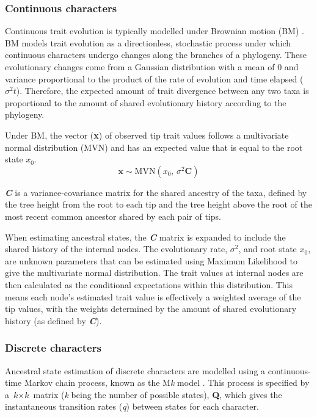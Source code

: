 \documentclass[titlepage]{article}
\begin{document}
\subsubsection{Continuous characters} \label{continuous ace}
Continuous trait evolution is typically modelled under Brownian motion (BM) \citep{felsenstein1985phylogenies, omeara2006testing}.
BM models trait evolution as a directionless, stochastic process under which continuous characters undergo changes along the branches of a phylogeny.
These evolutionary changes come from a Gaussian distribution with a mean of 0 and variance proportional to the product of the rate of evolution and time elapsed ($\sigma^2\textit{t}$). 
Therefore, the expected amount of trait divergence between any two taxa is proportional to the amount of shared evolutionary history according to the phylogeny.

Under BM, the vector (\textbf{x}) of observed tip trait values follows a multivariate normal distribution (MVN) and has an expected value that is equal to the root state $x_0$.
\[
\boldsymbol{x} \sim \mathrm{MVN}(x_{0},\, \sigma^2 \boldsymbol{C})
\]

\textbf{\textit{C}} is a variance-covariance matrix for the shared ancestry of the taxa, defined by the tree height from the root to each tip and the tree height above the root of the most recent common ancestor shared by each pair of tips.

When estimating ancestral states, the \textbf{\textit{C}} matrix is expanded to include the shared history of the internal nodes.
The evolutionary rate, $\sigma^2$, and root state $x_0$, are unknown parameters that can be estimated using Maximum Likelihood to give the multivariate normal distribution.
The trait values at internal nodes are then calculated as the conditional expectations within this distribution.
This means each node's estimated trait value is effectively a weighted average of the tip values, with the weights determined by the amount of shared evolutionary history (as defined by \textbf{\textit{C}}).

\subsubsection{Discrete characters} \label{ace discrete}
Ancestral state estimation of discrete characters are modelled using a continuous-time Markov chain process, known as the M\textit{k} model \citep{pagel1994detecting, yang2006computational}. 
This process is specified by a $\textit{k} \times \textit{k}$ matrix (\textit{k} being the number of possible states), \textbf{Q}, which gives the instantaneous transition rates (\textit{q}) between states for each character. 
\end{document}
